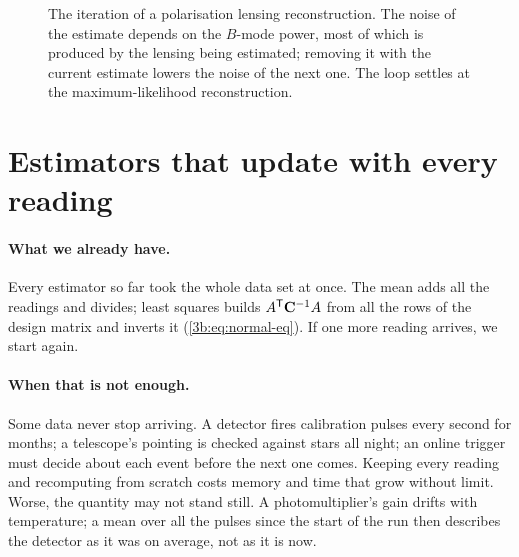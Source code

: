 \begin{figure}[htbp]
\centering
{}
\caption{The iteration of a polarisation lensing reconstruction. The noise
of the estimate depends on the $B$-mode power, most of which is produced by
the lensing being estimated; removing it with the current estimate lowers
the noise of the next one. The loop settles at the maximum-likelihood
reconstruction.}
\label{T5b:fig:lens-iter}
\end{figure}
\section{Estimators that update with every reading}
\label{T5b:sec:recursive}

\paragraph{What we already have.}
Every estimator so far took the whole data set at once. The mean adds all
the readings and divides; least squares builds $A^{\mathsf{T}}\mathbf{C}^{-1}A$ from all the rows
of the design matrix and inverts it (\cref{3b:eq:normal-eq}). If one more
reading arrives, we start again.

\paragraph{When that is not enough.}
Some data never stop arriving. A detector fires calibration pulses every
second for months; a telescope's pointing is checked against stars all
night; an online trigger must decide about each event before the next one
comes. Keeping every reading and recomputing from scratch costs memory and
time that grow without limit. Worse, the quantity may not stand still. A
photomultiplier's gain drifts with temperature; a mean over all the pulses
since the start of the run then describes the detector as it was on
average, not as it is now.

